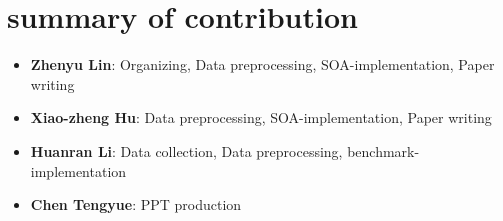 \section{summary of contribution}
\begin{itemize}
	\item \textbf{Zhenyu Lin}: Organizing, Data preprocessing, SOA-implementation, Paper writing
	
	\item \textbf{Xiao-zheng Hu}: Data preprocessing, SOA-implementation, Paper writing
	
	\item \textbf{Huanran Li}: Data collection, Data preprocessing, benchmark-implementation

	\item \textbf{Chen Tengyue}: PPT production
\end{itemize}